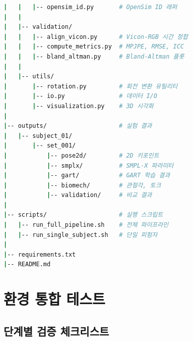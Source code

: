 \documentclass[11pt, a4paper]{report}
\begin{document}
\begin{termbox}[title={권장 디렉토리 레이아웃}]
\begin{lstlisting}[language=bash, numbers=none]
|   |   |-- opensim_id.py       # OpenSim ID 래퍼
|   |
|   |-- validation/
|   |   |-- align_vicon.py      # Vicon-RGB 시간 정합
|   |   |-- compute_metrics.py  # MPJPE, RMSE, ICC
|   |   |-- bland_altman.py     # Bland-Altman 플롯
|   |
|   |-- utils/
|       |-- rotation.py         # 회전 변환 유틸리티
|       |-- io.py               # 데이터 I/O
|       |-- visualization.py    # 3D 시각화
|
|-- outputs/                    # 실험 결과
|   |-- subject_01/
|       |-- set_001/
|           |-- pose2d/         # 2D 키포인트
|           |-- smplx/          # SMPL-X 파라미터
|           |-- gart/           # GART 학습 결과
|           |-- biomech/        # 관절각, 토크
|           |-- validation/     # 비교 결과
|
|-- scripts/                    # 실행 스크립트
|   |-- run_full_pipeline.sh    # 전체 파이프라인
|   |-- run_single_subject.sh   # 단일 피험자
|
|-- requirements.txt
|-- README.md
\end{lstlisting}
\end{termbox}


\chapter{환경 통합 테스트}
\label{ch:testing}

\section{단계별 검증 체크리스트}
\end{document}
